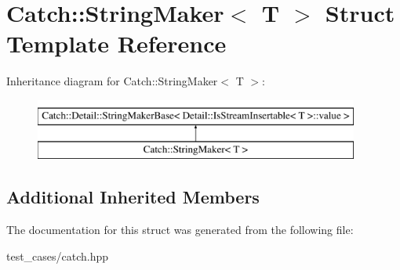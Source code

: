\hypertarget{structCatch_1_1StringMaker}{}\section{Catch\+:\+:String\+Maker$<$ T $>$ Struct Template Reference}
\label{structCatch_1_1StringMaker}
Inheritance diagram for Catch\+:\+:String\+Maker$<$ T $>$\+:\begin{figure}[H]
\begin{center}
\leavevmode
\includegraphics[height=2.000000cm]{structCatch_1_1StringMaker}
\end{center}
\end{figure}
\subsection*{Additional Inherited Members}


The documentation for this struct was generated from the following file\+:\begin{DoxyCompactItemize}
\item 
test\+\_\+cases/catch.\+hpp\end{DoxyCompactItemize}
